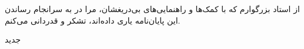 


\begin{center}
\end{center}

از استاد بزرگوارم که با کمک‌ها و راهنمایی‌های بی‌دریغشان، مرا در به سرانجام رساندن این پایان‌نامه یاری داده‌اند، تشکر و قدردانی می‌کنم.

‌جدید
